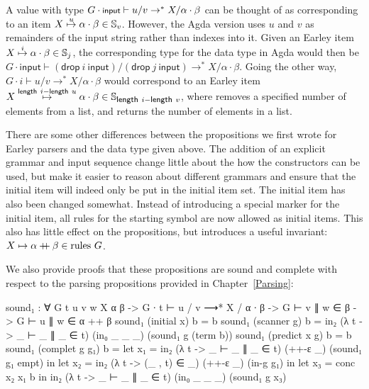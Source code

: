 		A value with type $G \cdot \textsf{\footnotesize{}input} \vdash u / v \rightarrow^* X
		/ \alpha \cdot \beta$ can be thought of as corresponding to an item
		$X\overset{u}{\mapsto}\alpha\cdot\beta \in \mathbb{S}_v$. However, the Agda
		version uses $u$ and $v$ as remainders of the input string rather than
		indexes into it.  Given an Earley item {$X\overset{i}{\mapsto}\alpha\cdot\beta
		\in \mathbb{S}_j$, the corresponding type for the data type in Agda
		would then be $G \cdot \textsf{input} \vdash
		(\textsf{drop}~i~\textsf{input}) / (\textsf{drop}~j~\textsf{input})
		\rightarrow^* X / \alpha \cdot \beta$.  Going the other way, $G \cdot i
		\vdash u / v \rightarrow^* X / \alpha \cdot \beta$ would correspond to
		an Earley item $X\overset{\textsf{length}~i -
		\textsf{length}~u}{\mapsto}\alpha\cdot\beta \in \mathbb{S}_{\textsf{\footnotesize{}length}~i -
		\textsf{\footnotesize{}length}~v}$}, where  removes a specified number of
		elements from a list, and  returns the number of
		elements in a list.

		There are some other differences between the propositions we first
		wrote for Earley parsers and the data type given above. The addition of
		an explicit grammar and input sequence change little about the how the
		constructors can be used, but make it easier to reason about different
		grammars and ensure that the initial item will indeed only be put in
		the initial item set. The initial item has also been changed somewhat.
		Instead of introducing a special marker for the initial item, all rules
		for the starting symbol are now allowed as initial items.  This also
		has little effect on the propositions, but introduces a useful
		invariant: $X \mapsto \alpha \mathbin{{+}\mspace{-8mu}{+}} \beta \in \textrm{rules } G$.

		We also provide proofs that these propositions are sound and complete
		with respect to the parsing propositions provided in
		Chapter~\ref{Parsing}:

		\begin{code}
			sound₁ : ∀ {G t u v w X α β} ->
			  G ∙ t ⊢ u / v ⟶* X / α ∙ β ->
			    G ⊢ v ∥ w ∈ β ->
			    G ⊢ u ∥ w ∈ α ++ β
			sound₁ (initial x) b = b
			sound₁ (scanner g) b = in₂ (λ t -> _ ⊢ _ ∥ _ ∈ t) (in₀ _ _ _) (sound₁ g (term b))
			sound₁ (predict x g) b = b
			sound₁ (complet g g₁) b =
			  let x₁ = in₂ (λ t -> _ ⊢ _ ∥ _ ∈ t) (++-ε _) (sound₁ g₁ empt) in
			  let x₂ = in₂ (λ t -> (_ , t) ∈ _) (++-ε _) (in-g g₁) in
			  let x₃ = conc x₂ x₁ b in
			  in₂ (λ t -> _ ⊢ _ ∥ _ ∈ t) (in₀ _ _ _) (sound₁ g x₃)
		\end{code}

